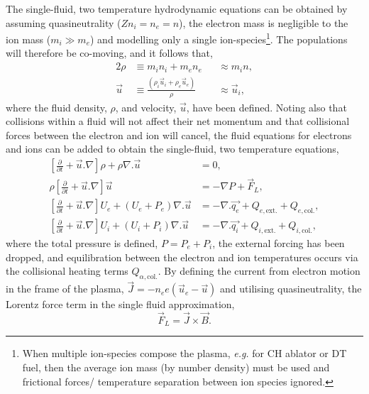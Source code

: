 The single-fluid, two temperature hydrodynamic equations can be obtained by assuming quasineutrality ($Z n_i = n_e = n$), the electron mass is negligible to the ion mass ($m_i \gg m_e$) and modelling only a single ion-species\footnote{When multiple ion-species compose the plasma, \textit{e.g.} for CH ablator or DT fuel, then the average ion mass (by number density) must be used and frictional forces/ temperature separation between ion species ignored.}.
The populations will therefore be co-moving, and it follows that,
\begin{alignat}{2}
    \rho &\equiv m_i n_i + m_e n_e &&\approx m_i n,\\
    \vec{u} &\equiv \frac{(\rho_i \vec{u}_i + \rho_e \vec{u}_e)}{\rho} &&\approx \vec{u}_i,
\end{alignat}
where the fluid density, $\rho$, and velocity, $\vec{u}$, have been defined.
Noting also that collisions within a fluid will not affect their net momentum and that collisional forces between the electron and ion will cancel, the fluid equations for electrons and ions can be added to obtain the single-fluid, two temperature equations,
\begin{align}
    \label{eq:theory_singlefluid_eqs_1}
    \left [ \frac{\partial}{\partial t} + \vec{u}.\nabla \right ] \rho + \rho\nabla . \vec{u} &= 0,\\
    \label{eq:theory_singlefluid_eqs_2}
    \rho \left [ \frac{\partial}{\partial t} + \vec{u}.\nabla \right ] \vec{u} &= -\nabla P + \vec{F}_{L},\\
    \label{eq:theory_singlefluid_eqs_3}
    \left [ \frac{\partial}{\partial t} + \vec{u}.\nabla \right ] U_e + (U_e + P_e)\nabla.\vec{u} &= -\nabla . \vec{q_e} + Q_{e,\text{ext.}} + Q_{e,\text{col.}},\\
    \label{eq:theory_singlefluid_eqs_4}
    \left [ \frac{\partial}{\partial t} + \vec{u}.\nabla \right ] U_i + (U_i + P_i)\nabla.\vec{u} &= -\nabla . \vec{q_i} + Q_{i,\text{ext.}} + Q_{i,\text{col.}},
\end{align}
where the total pressure is defined, $P=P_e+P_i$, the external forcing has been dropped, and equilibration between the electron and ion temperatures occurs via the collisional heating terms $Q_{\alpha,\text{col.}}$.
By defining the current from electron motion in the frame of the plasma, $\vec{J}=-n_e e (\vec{u}_e - \vec{u})$ and utilising quasineutrality, the Lorentz force term in the single fluid approximation,
\begin{equation}
    \label{eq:theory_lorentz_force}
    \vec{F}_{L} = \vec{J}\times\vec{B}.
\end{equation}
